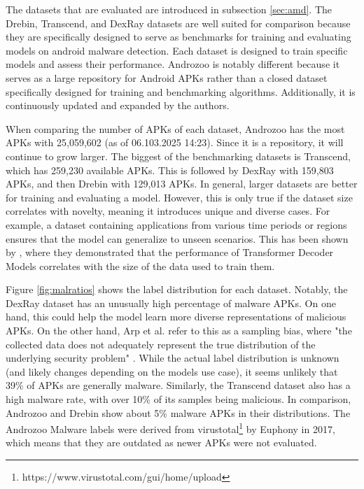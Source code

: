 The datasets that are evaluated are introduced in subsection \ref{sec:amd}.
The Drebin, Transcend, and DexRay datasets are well suited for comparison because they are 
specifically designed to serve as benchmarks for training and evaluating models on android malware detection. 
Each dataset is designed to train specific models and assess their performance. 
Androzoo is notably different because it serves as a large repository for Android APKs rather 
than a closed dataset specifically designed for training and benchmarking algorithms. 
Additionally, it is continuously updated and expanded by the authors.

When comparing the number of APKs of each dataset, Androzoo has the most APKs with 25,059,602 
(as of 06.103.2025 14:23). 
Since it is a repository, it will continue to grow larger.
The biggest of the benchmarking datasets is Transcend, which has 259,230 available APKs. 
This is followed by DexRay with 159,803 APKs, and then Drebin with 129,013 APKs. 
In general, larger datasets are better for training and evaluating a model. 
However, this is only true if the dataset size correlates with novelty, 
meaning it introduces unique and diverse cases. 
For example, a dataset containing applications from various time periods or regions 
ensures that the model can generalize to unseen scenarios. 
This has been shown by \cite{scalinglaws}, 
where they demonstrated that the performance of Transformer Decoder Models 
correlates with the size of the data used to train them.

Figure \ref{fig:malratios} shows the label distribution for each dataset. 
Notably, the DexRay dataset has an unusually high percentage of malware APKs. 
On one hand, this could help the model learn more diverse representations of malicious APKs. 
On the other hand, Arp et al. refer to this as a sampling bias, where 
"the collected data does not adequately represent the true distribution of 
the underlying security problem" \cite{dodo}. 
While the actual label distribution is unknown 
(and likely changes depending on the models use case), 
it seems unlikely that 39\% of APKs are generally malware. 
Similarly, the Transcend dataset also has a high malware rate, 
with over 10\% of its samples being malicious. 
In comparison, Androzoo and Drebin show about 5\% malware APKs in their distributions. 
The Androzoo Malware labels were derived from 
virustotal\footnote{https://www.virustotal.com/gui/home/upload} by 
Euphony \cite{androzoo_malware} in 2017, 
which means that they are outdated as newer APKs were not evaluated.


